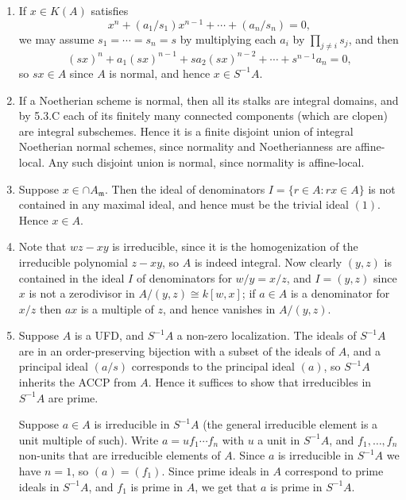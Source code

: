 \documentclass{report}
\newcommand{\m}{\mathfrak{m}}
\begin{document}
\begin{enumerate}[label=\textbf{5.4.\Alph*.}]
	\item If $x\in K(A)$ satisfies
	      \begin{equation*}
		      x^n + (a_1/s_1)x^{n-1} + \cdots + (a_n/s_n) = 0,
	      \end{equation*}
	      we may assume $s_1=\cdots=s_n=s$ by multiplying each $a_i$ by
	      $\prod_{j\ne i}s_j$, and then
	      \begin{equation*}
		      (sx)^n + a_1(sx)^{n-1} + sa_2(sx)^{n-2} + \cdots + s^{n-1}a_n = 0,
	      \end{equation*}
	      so $sx\in A$ since $A$ is normal, and hence $x\in S^{-1}A$.

	\item If a Noetherian scheme is normal, then all its stalks are integral
	      domains, and by 5.3.C each of its finitely many connected components
	      (which are clopen) are integral subschemes. Hence it is a finite
	      disjoint union of integral Noetherian normal schemes, since normality
	      and Noetherianness are affine-local. Any such disjoint union is normal,
	      since normality is affine-local.

	\item Suppose $x\in\cap A_\m$. Then the ideal of denominators
	      $I = \{r\in A:rx\in A\}$ is not contained in any maximal ideal, and
	      hence must be the trivial ideal $(1)$. Hence $x\in A$.

	\item Note that $wz-xy$ is irreducible, since it is the homogenization of
	      the irreducible polynomial $z-xy$, so $A$ is indeed integral. Now
	      clearly $(y,z)$ is contained in the ideal $I$ of denominators for
	      $w/y=x/z$, and $I=(y,z)$ since $x$ is not a zerodivisor in
	      $A/(y,z)\cong k[w,x]$; if $a\in A$ is a denominator for $x/z$ then $ax$
	      is a multiple of $z$, and hence vanishes in $A/(y,z)$.

	\item Suppose $A$ is a UFD, and $S^{-1}A$ a non-zero localization. The
	      ideals of $S^{-1}A$ are in an order-preserving bijection with a subset
	      of the ideals of $A$, and a principal ideal $(a/s)$ corresponds to the
	      principal ideal $(a)$, so $S^{-1}A$ inherits the ACCP from $A$. Hence it
	      suffices to show that irreducibles in $S^{-1}A$ are prime.

	      Suppose $a\in A$ is irreducible in $S^{-1}A$ (the general irreducible
	      element is a unit multiple of such). Write $a=uf_1\cdots f_n$ with $u$
	      a unit in $S^{-1}A$, and $f_1,\ldots,f_n$ non-units that are irreducible
	      elements of $A$. Since $a$ is irreducible in $S^{-1}A$ we have $n=1$, so
	      $(a)=(f_1)$. Since prime ideals in $A$ correspond to prime ideals in
	      $S^{-1}A$, and $f_1$ is prime in $A$, we get that $a$ is prime in
	      $S^{-1}A$.


\end{enumerate}
\end{document}
